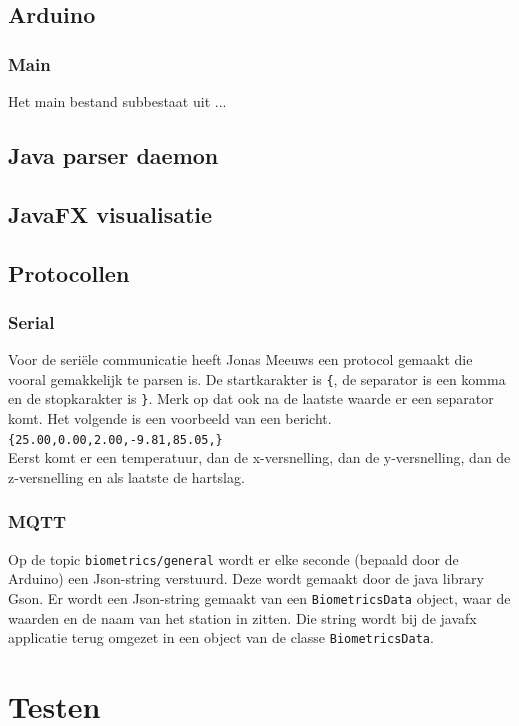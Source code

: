 \documentclass[a4paper]{report}
\begin{document}
\section{Arduino}
\subsection{Main}
Het main bestand subbestaat uit ...

\section{Java parser daemon}

\section{JavaFX visualisatie}

\section{Protocollen}
\subsection{Serial}
Voor de seri\"ele communicatie heeft Jonas Meeuws een protocol gemaakt die vooral gemakkelijk te parsen is.
De startkarakter is \verb!{!, de separator is een komma en de stopkarakter is \verb!}!.
Merk op dat ook na de laatste waarde er een separator komt.
Het volgende is een voorbeeld van een bericht.\\
\indent \verb!{25.00,0.00,2.00,-9.81,85.05,}!\\
Eerst komt er een temperatuur, dan de x-versnelling, dan de y-versnelling, dan de z-versnelling en als laatste de hartslag.

\subsection{MQTT}
Op de topic \verb!biometrics/general! wordt er elke seconde (bepaald door de Arduino) een Json-string verstuurd.
Deze wordt gemaakt door de java library Gson.
Er wordt een Json-string gemaakt van een \verb!BiometricsData! object, waar de waarden en de naam van het station in zitten.
Die string wordt bij de javafx applicatie terug omgezet in een object van de classe \verb!BiometricsData!.

\chapter{Testen}
\end{document}

